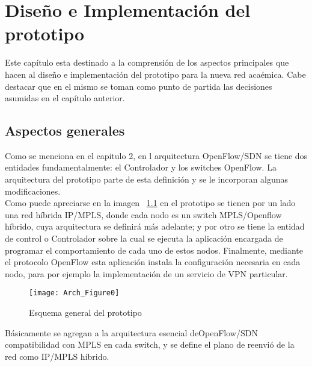 \chapter{Dise\~no e Implementaci\'on del prototipo}

\ifpdf
    \graphicspath{{Chapter4/Figs/Raster/}{Chapter4/Figs/PDF/}{Chapter4/Figs/}}
\else
    \graphicspath{{Chapter4/Figs/Vector/}{Chapter4/Figs/}}
\fi

Este cap\'itulo esta destinado a la comprensi\'on de los aspectos principales que hacen al dise\~no e implementaci\'on del prototipo para la nueva red aca\'emica. Cabe destacar que en el mismo se toman como punto de partida las decisiones asumidas en el cap\'itulo anterior.\\

\section{Aspectos generales}

Como se menciona en el capitulo 2, en l arquitectura OpenFlow/SDN se tiene dos entidades fundamentalmente: el Controlador y los switches OpenFlow. La arquitectura del prototipo parte de esta definición y se le incorporan algunas modificaciones.\\

Como puede apreciarse en la imagen ~\ref{fig:OpenSourceRArch0} en el prototipo se tienen por un lado una red h\'ibrida IP/MPLS, donde cada nodo es un switch MPLS/Openflow híbrido, cuya arquitectura se definir\'a m\'as adelante; y por otro se tiene la entidad de control o Controlador sobre la cual se ejecuta la aplicaci\'on encargada de programar el comportamiento de cada uno de estos nodos. Finalmente, mediante el protocolo OpenFlow esta aplicaci\'on instala la configuraci\'on necesaria en cada nodo, para por ejemplo la implementaci\'on de un servicio de VPN particular.\\

\newpage
\begin{figure}[htbp!] 
\centering    
\texttt{[image: Arch\_Figure0]}
\caption[OpenSourceRArch0]{Esquema general del prototipo}
\label{fig:OpenSourceRArch0}
\end{figure}

Básicamente se agregan a la arquitectura esencial deOpenFlow/SDN compatibilidad con MPLS en cada switch, y se define el plano de reenvió de la red como IP/MPLS híbrido.\\ 
 
